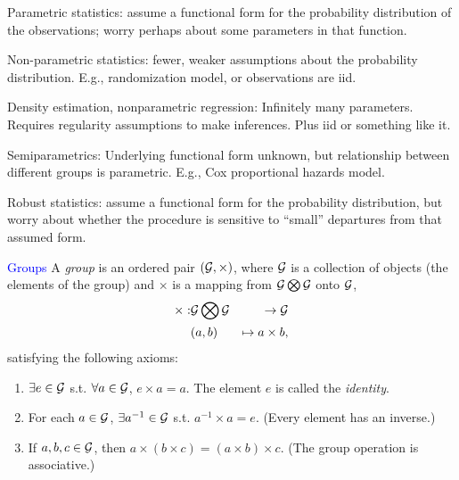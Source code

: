 \documentclass[landscape]{slides}
\newcommand{\cG}{{\cal G}}
\begin{document}
\begin{slide}

{\textcolor{one}{Parametric statistics:}} assume a functional form for the 
probability distribution of the observations; worry perhaps about some parameters 
in that function. 

{\textcolor{one}{Non-parametric statistics:}} fewer, weaker assumptions about the 
probability distribution.  E.g., randomization model, or observations are iid.

{\textcolor{one}{Density estimation, nonparametric regression:}}
Infinitely many parameters.  Requires regularity assumptions to make inferences.
Plus iid or something like it.

{\textcolor{one}{Semiparametrics:}} Underlying functional form unknown, but relationship
between different groups is parametric. E.g., Cox proportional hazards model.

{\textcolor{one}{Robust statistics:}} assume a functional form for the probability 
distribution, but worry about whether the procedure is sensitive to ``small'' departures 
from that assumed form. 

\end{slide}

\begin{slide}
{\textcolor{blue}{Groups}}
A {\em group\/} is an ordered pair $(\cG, \times)$, where $\cG$ is
        a collection of objects (the elements of the group) and $\times$ is a mapping
        from $\cG \bigotimes \cG$ onto $\cG$,
        \begin{eqnarray*}
                \times : & \cG \bigotimes \cG & \rightarrow \cG \\
                         & (a, b) & \mapsto a \times b,
        \end{eqnarray*}
        satisfying the following axioms:
        \begin{enumerate}
                \item $\exists e \in \cG$ s.t. $\forall a \in \cG$, $e \times a = a$.
                        The element $e$ is called the {\em identity\/}.
                \item For each $a \in \cG$, $\exists a^{-1} \in \cG$ s.t. $a^{-1}\times a = e$.
                        (Every element has an inverse.)
                \item If $a, b, c \in \cG$, then $a \times (b \times c) = (a \times b)\times c$.
                        (The group operation is associative.)
        \end{enumerate}

\end{slide}
\end{document}
